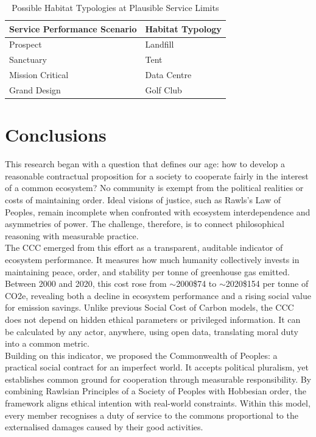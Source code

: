 \documentclass[10pt, oneside]{article}   	%
\begin{document}
\begin{table}[H]
\caption{Possible Habitat Typologies at Plausible Service Limits}
\begin{center}
\begin{tabular}{| l | l |}
\hline
Service Performance Scenario&Habitat Typology\\
\hline
Prospect&Landfill\\
Sanctuary&Tent\\
Mission Critical&Data Centre\\
Grand Design&Golf Club\\
\hline
\end{tabular}
\end{center}
\label{Service limits table}
\end{table}

\section{Conclusions}

This research began with a question that defines our age: how to develop a reasonable contractual proposition for a society to cooperate fairly in the interest of a common ecosystem?
No community is exempt from the political realities or costs of maintaining order.
Ideal visions of justice, such as Rawls’s Law of Peoples, remain incomplete when confronted with ecosystem interdependence and asymmetries of power.
The challenge, therefore, is to connect philosophical reasoning with measurable practice.\\

The CCC emerged from this effort as a transparent, auditable indicator of ecosystem performance.
It measures how much humanity collectively invests in maintaining peace, order, and stability per tonne of greenhouse gas emitted.
Between 2000 and 2020, this cost rose from $\sim$2000\$74 to $\sim$2020\$154 per tonne of CO2e, revealing both a decline in ecosystem performance and a rising social value for emission savings.
Unlike previous Social Cost of Carbon models, the CCC does not depend on hidden ethical parameters or privileged information.
It can be calculated by any actor, anywhere, using open data, translating moral duty into a common metric.\\

Building on this indicator, we proposed the Commonwealth of Peoples: a practical social contract for an imperfect world.
It accepts political pluralism, yet establishes common ground for cooperation through measurable responsibility.
By combining Rawlsian Principles of a Society of Peoples with Hobbesian order, the framework aligns ethical intention with real-world constraints.
Within this model, every member recognises a duty of service to the commons proportional to the externalised damages caused by their good activities.\\
\end{document}
